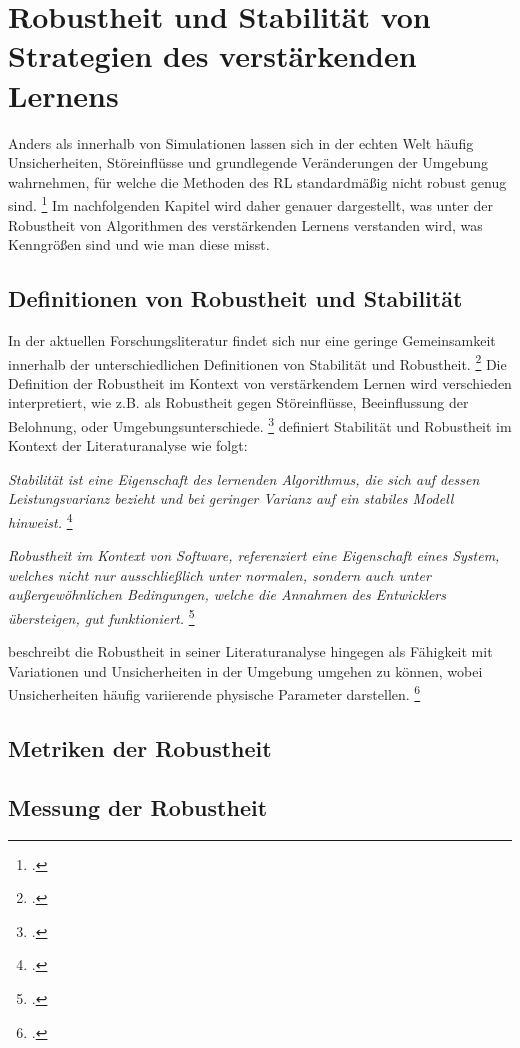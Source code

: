 \section{Robustheit und Stabilität von Strategien des verstärkenden Lernens}

Anders als innerhalb von Simulationen lassen sich in der echten Welt häufig Unsicherheiten, Störeinflüsse und grundlegende Veränderungen der Umgebung wahrnehmen, für welche die Methoden des RL standardmäßig nicht robust genug sind. \footcite[Vgl.][S. 1]{Moos.2022}
Im nachfolgenden Kapitel wird daher genauer dargestellt, was unter der Robustheit von Algorithmen des verstärkenden Lernens verstanden wird, was Kenngrößen sind und wie man diese misst.

\subsection{Definitionen von Robustheit und Stabilität}

In der aktuellen Forschungsliteratur findet sich nur eine geringe Gemeinsamkeit innerhalb der unterschiedlichen Definitionen von Stabilität und Robustheit. \footcite[Vgl.][S. 5]{Pullum.2022}
Die Definition der Robustheit im Kontext von verstärkendem Lernen wird verschieden interpretiert, wie z.B. als Robustheit gegen Störeinflüsse, Beeinflussung der Belohnung, oder Umgebungsunterschiede. \footcite[Vgl.][S. 2]{Liu.2023}
\cite[]{Pullum.2022} definiert Stabilität und Robustheit im Kontext der Literaturanalyse wie folgt:

\textit{Stabilität ist eine Eigenschaft des lernenden Algorithmus, die sich auf dessen Leistungsvarianz bezieht und bei geringer Varianz auf ein stabiles Modell hinweist.} \footcite[Vgl.][S. 5]{Pullum.2022}

\textit{Robustheit im Kontext von Software, referenziert eine Eigenschaft eines System, welches nicht nur ausschließlich unter normalen, sondern auch unter außergewöhnlichen Bedingungen, welche die Annahmen des Entwicklers übersteigen, gut funktioniert.} \footcite[Vgl.][S. 5]{Pullum.2022}

\cite[]{Moos.2022} beschreibt die Robustheit in seiner Literaturanalyse hingegen als Fähigkeit mit Variationen und Unsicherheiten in der Umgebung umgehen zu können, wobei Unsicherheiten häufig variierende physische Parameter darstellen. \footcite[Vgl.][S. 1]{Moos.2022}

\subsection{Metriken der Robustheit}

\subsection{Messung der Robustheit}

